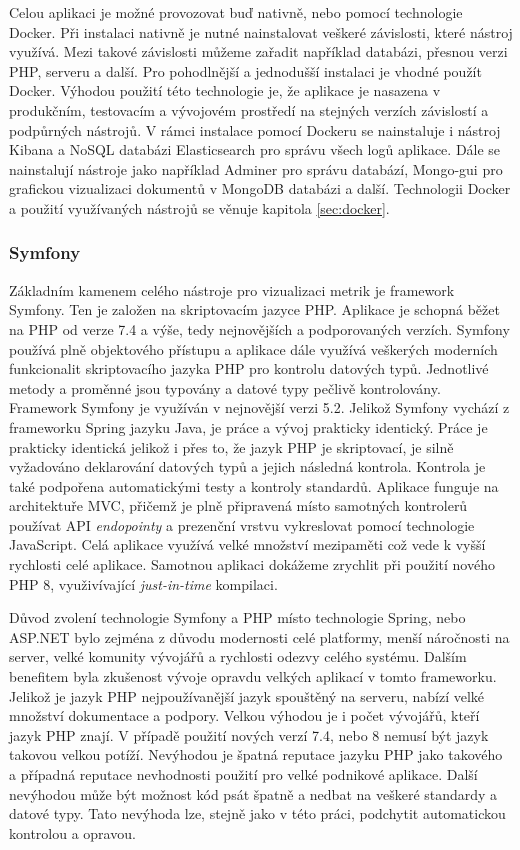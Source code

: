 \documentclass[czech,master,public,dept460,male,cpdeclaration,oneside]{diploma}
\begin{document}
 
Celou aplikaci je možné provozovat buď nativně, nebo pomocí technologie Docker. Při instalaci nativně je nutné nainstalovat veškeré závislosti, které nástroj využívá. Mezi takové závislosti můžeme zařadit například databázi, přesnou verzi PHP, serveru a další. Pro pohodlnější a jednodušší instalaci je vhodné použít Docker. Výhodou použití této technologie je, že aplikace je nasazena v produkčním, testovacím a vývojovém prostředí na stejných verzích závislostí a podpůrných nástrojů. V rámci instalace pomocí Dockeru se nainstaluje i nástroj Kibana a NoSQL databázi Elasticsearch pro správu všech logů aplikace. Dále se nainstalují nástroje jako například Adminer pro správu databází,  Mongo-gui pro grafickou vizualizaci dokumentů v MongoDB databázi a další. Technologii Docker a použití využívaných nástrojů se věnuje kapitola \ref{sec:docker}.

\subsubsection{Symfony}
\label{sec:symfony}
Základním kamenem celého nástroje pro vizualizaci metrik je framework Symfony. Ten je založen na skriptovacím jazyce PHP. Aplikace je schopná běžet na PHP od verze 7.4 a výše, tedy nejnovějších a podporovaných verzích. Symfony používá plně objektového přístupu a aplikace dále využívá veškerých moderních funkcionalit skriptovacího jazyka PHP pro kontrolu datových typů. Jednotlivé metody a proměnné jsou typovány a datové typy pečlivě kontrolovány. Framework Symfony je využíván v nejnovější verzi 5.2. Jelikož Symfony vychází z frameworku Spring jazyku Java, je práce a vývoj prakticky identický. Práce je prakticky identická jelikož i přes to, že jazyk PHP je skriptovací, je silně vyžadováno deklarování datových typů a jejich následná kontrola. Kontrola je také podpořena automatickými testy a kontroly standardů. Aplikace funguje na architektuře MVC, přičemž je plně připravená místo samotných kontrolerů používat API \textit{endopointy} a prezenční vrstvu vykreslovat pomocí technologie JavaScript. Celá aplikace využívá velké množství mezipaměti což vede k vyšší rychlosti celé aplikace. Samotnou aplikaci dokážeme zrychlit při použití nového PHP 8, využivívající \textit{just-in-time} kompilaci.

Důvod zvolení technologie Symfony a PHP místo technologie Spring, nebo ASP.NET bylo zejména z důvodu modernosti celé platformy, menší náročnosti na server, velké komunity vývojářů a rychlosti odezvy celého systému. Dalším benefitem byla zkušenost vývoje opravdu velkých aplikací v tomto frameworku. Jelikož je jazyk PHP nejpoužívanější jazyk spouštěný na serveru, nabízí velké množství dokumentace a podpory. \cite{ref:php_trend} Velkou výhodou je i počet vývojářů, kteří jazyk PHP znají.  V případě použití nových verzí 7.4, nebo 8 nemusí být jazyk takovou velkou potíží. Nevýhodou je špatná reputace jazyku PHP jako takového a případná reputace nevhodnosti použití pro velké podnikové aplikace. Další nevýhodou může být možnost kód psát špatně a nedbat na veškeré standardy a datové typy. Tato nevýhoda lze, stejně jako v této práci, podchytit automatickou kontrolou a opravou.
\end{document}
